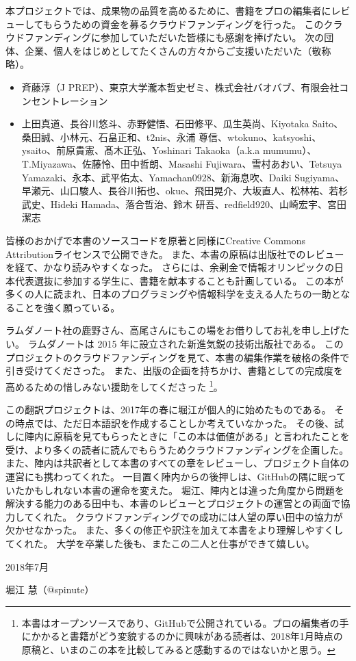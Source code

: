 本プロジェクトでは、成果物の品質を高めるために、書籍をプロの編集者にレビューしてもらうための資金を募るクラウドファンディングを行った。
このクラウドファンディングに参加していただいた皆様にも感謝を捧げたい。
次の団体、企業、個人をはじめとしてたくさんの方々からご支援いただいた（敬称略）。 %
\begin{itemize}
\item 斉藤淳（J PREP）、東京大学瀧本哲史ゼミ、株式会社バオバブ、有限会社コンセントレーション
\item 上田真道、長谷川悠斗、赤野健悟、石田修平、瓜生英尚、Kiyotaka Saito、桑田誠、小林元、石畠正和、t2nis、永浦 尊信、wtokuno、katsyoshi、ysaito、前原貴憲、髙木正弘、Yoshinari Takaoka（a.k.a mumumu）、T.Miyazawa、佐藤怜、田中哲朗、Masashi Fujiwara、雪村あおい、Tetsuya Yamazaki、永本、武平佑太、Yamachan0928、新海息吹、Daiki Sugiyama、早瀬元、山口駿人、長谷川拓也、okue、飛田晃介、大坂直人、松林祐、若杉武史、Hideki Hamada、落合哲治、鈴木 研吾、redfield920、山崎宏宇、宮田潔志
\end{itemize}

皆様のおかげで本書のソースコードを原著と同様にCreative Commons Attributionライセンスで公開できた。
また、本書の原稿は出版社でのレビューを経て、かなり読みやすくなった。
さらには、余剰金で情報オリンピックの日本代表選抜に参加する学生に、書籍を献本することも計画している。
この本が多くの人に読まれ、日本のプログラミングや情報科学を支える人たちの一助となることを強く願っている。

ラムダノート社の鹿野さん、高尾さんにもこの場をお借りしてお礼を申し上げたい。
ラムダノートは 2015 年に設立された新進気鋭の技術出版社である。
このプロジェクトのクラウドファンディングを見て、本書の編集作業を破格の条件で引き受けてくださった。
また、出版の企画を持ちかけ、書籍としての完成度を高めるための惜しみない援助をしてくださった
\footnote{本書はオープンソースであり、GitHubで公開されている。プロの編集者の手にかかると書籍がどう変貌するのかに興味がある読者は、2018年1月時点の原稿と、いまのこの本を比較してみると感動するのではないかと思う。}。

この翻訳プロジェクトは、2017年の春に堀江が個人的に始めたものである。
その時点では、ただ日本語訳を作成することしか考えていなかった。
その後、試しに陣内に原稿を見てもらったときに「この本は価値がある」と言われたことを受け、より多くの読者に読んでもらうためクラウドファンディングを企画した。
また、陣内は共訳者として本書のすべての章をレビューし、プロジェクト自体の運営にも携わってくれた。
一目置く陣内からの後押しは、GitHubの隅に眠っていたかもしれない本書の運命を変えた。
堀江、陣内とは違った角度から問題を解決する能力のある田中も、本書のレビューとプロジェクトの運営との両面で協力してくれた。
クラウドファンディングでの成功には人望の厚い田中の協力が欠かせなかった。
また、多くの修正や訳注を加えて本書をより理解しやすくしてくれた。
大学を卒業した後も、またこの二人と仕事ができて嬉しい。

\noindent\hspace*{2em}
2018年7月

\hfill 堀江 慧（@spinute）

